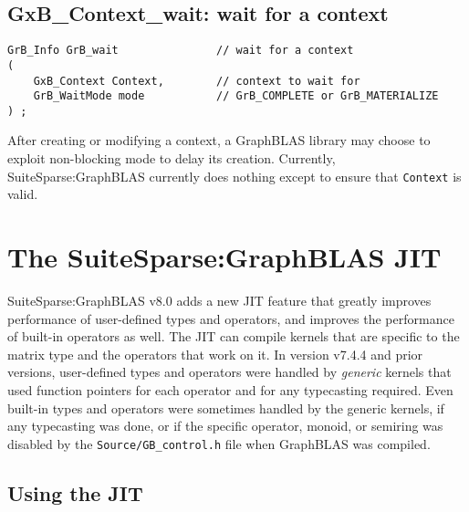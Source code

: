 \documentclass[12pt]{article}
\begin{document}
\subsection{{\sf GxB\_Context\_wait:} wait for a context}
\label{context_wait}

\begin{mdframed}[userdefinedwidth=6in]
{\footnotesize
\begin{verbatim}
GrB_Info GrB_wait               // wait for a context
(
    GxB_Context Context,        // context to wait for
    GrB_WaitMode mode           // GrB_COMPLETE or GrB_MATERIALIZE
) ;
\end{verbatim}
}\end{mdframed}

After creating or modifying a context, a GraphBLAS library may choose to
exploit non-blocking mode to delay its creation.  Currently,
SuiteSparse:GraphBLAS currently does nothing except to ensure that
\verb'Context' is valid.

\newpage
\section{The SuiteSparse:GraphBLAS JIT} %
\label{jit}

SuiteSparse:GraphBLAS v8.0 adds a new JIT feature that greatly improves
performance of user-defined types and operators, and improves the performance
of built-in operators as well.  The JIT can compile kernels that are specific
to the matrix type and the operators that work on it.  In version v7.4.4 and
prior versions, user-defined types and operators were handled by {\em generic}
kernels that used function pointers for each operator and for any typecasting
required.  Even built-in types and operators were sometimes handled by the
generic kernels, if any typecasting was done, or if the specific operator,
monoid, or semiring was disabled by the \verb'Source/GB_control.h' file when
GraphBLAS was compiled.

\subsection{Using the JIT}
\end{document}
